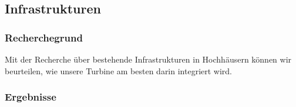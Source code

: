 \subsection{Infrastrukturen}

\subsubsection{Recherchegrund}

Mit der Recherche über bestehende Infrastrukturen in Hochhäusern können wir beurteilen, wie unsere Turbine am besten darin integriert wird.



\subsubsection{Ergebnisse}

